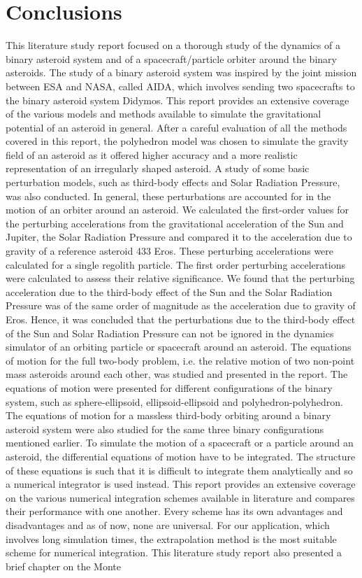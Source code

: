 \chapter{Conclusions}
\label{conclusion}

This literature study report focused on a thorough study of the dynamics of a binary asteroid system and of a spacecraft/particle orbiter around the binary asteroids. The study of a binary asteroid system was inspired by the joint mission between \gls{ESA} and \gls{NASA}, called \gls{AIDA}, which involves sending two spacecrafts to the binary asteroid system Didymos. This report provides an extensive coverage of the various models and methods available to simulate the gravitational potential of an asteroid in general. After a careful evaluation of all the methods covered in this report, the polyhedron model was chosen to simulate the gravity field of an asteroid as it offered higher accuracy and a more realistic representation of an irregularly shaped asteroid. A study of some basic perturbation models, such as third-body effects and Solar Radiation Pressure, was also conducted. In general, these perturbations are accounted for in the motion of an orbiter around an asteroid. We calculated the first-order values for the perturbing accelerations from the gravitational acceleration of the Sun and Jupiter, the Solar Radiation Pressure and compared it to the acceleration due to gravity of a reference asteroid 433 Eros. These perturbing accelerations were calculated for a single regolith particle. The first order perturbing accelerations were calculated to assess their relative significance. We found that the perturbing acceleration due to the third-body effect of the Sun and the Solar Radiation Pressure was of the same order of magnitude as the acceleration due to gravity of Eros. Hence, it was concluded that the perturbations due to the third-body effect of the Sun and Solar Radiation Pressure can not be ignored in the dynamics simulator of an orbiting particle or spacecraft around an asteroid. The equations of motion for the full two-body problem, i.e. the relative motion of two non-point mass asteroids around each other, was studied and presented in the report. The equations of motion were presented for different configurations of the binary system, such as sphere-ellipsoid, ellipsoid-ellipsoid and polyhedron-polyhedron. The equations of motion for a massless third-body orbiting around a binary asteroid system were also studied for the same three binary configurations mentioned earlier. To simulate the motion of a spacecraft or a particle around an asteroid, the differential equations of motion have to be integrated. The structure of these equations is such that it is difficult to integrate them analytically and so a numerical integrator is used instead. This report provides an extensive coverage on the various numerical integration schemes available in literature and compares their performance with one another. Every scheme has its own advantages and disadvantages and as of now, none are universal. For our application, which involves long simulation times, the extrapolation method is the most suitable scheme for numerical integration. This literature study report also presented a brief chapter on the Monte 